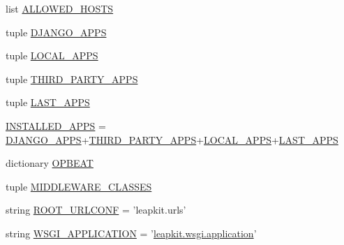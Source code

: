 \begin{DoxyCompactItemize}
\item 
list \hyperlink{namespaceleapkit_1_1settings_1_1base__settings__local_a185e8583ef8f8aeae3517746541daec9}{A\-L\-L\-O\-W\-E\-D\-\_\-\-H\-O\-S\-T\-S}
\item 
tuple \hyperlink{namespaceleapkit_1_1settings_1_1base__settings__local_ac5fa624a9af1a233bfa1639b0fecf935}{D\-J\-A\-N\-G\-O\-\_\-\-A\-P\-P\-S}
\item 
tuple \hyperlink{namespaceleapkit_1_1settings_1_1base__settings__local_a5ff0b2d3a2d30f22997751f82d8fa0a8}{L\-O\-C\-A\-L\-\_\-\-A\-P\-P\-S}
\item 
tuple \hyperlink{namespaceleapkit_1_1settings_1_1base__settings__local_a0d60a9ab4614c31fde45d98813148e97}{T\-H\-I\-R\-D\-\_\-\-P\-A\-R\-T\-Y\-\_\-\-A\-P\-P\-S}
\item 
tuple \hyperlink{namespaceleapkit_1_1settings_1_1base__settings__local_a55f0e121386dcf8a431d6dd210d0ece0}{L\-A\-S\-T\-\_\-\-A\-P\-P\-S}
\item 
\hyperlink{namespaceleapkit_1_1settings_1_1base__settings__local_a02c8604143dd319d558c42a69c1c0a35}{I\-N\-S\-T\-A\-L\-L\-E\-D\-\_\-\-A\-P\-P\-S} = \hyperlink{namespaceleapkit_1_1settings_1_1base__settings__local_ac5fa624a9af1a233bfa1639b0fecf935}{D\-J\-A\-N\-G\-O\-\_\-\-A\-P\-P\-S}+\hyperlink{namespaceleapkit_1_1settings_1_1base__settings__local_a0d60a9ab4614c31fde45d98813148e97}{T\-H\-I\-R\-D\-\_\-\-P\-A\-R\-T\-Y\-\_\-\-A\-P\-P\-S}+\hyperlink{namespaceleapkit_1_1settings_1_1base__settings__local_a5ff0b2d3a2d30f22997751f82d8fa0a8}{L\-O\-C\-A\-L\-\_\-\-A\-P\-P\-S}+\hyperlink{namespaceleapkit_1_1settings_1_1base__settings__local_a55f0e121386dcf8a431d6dd210d0ece0}{L\-A\-S\-T\-\_\-\-A\-P\-P\-S}
\item 
dictionary \hyperlink{namespaceleapkit_1_1settings_1_1base__settings__local_a1167f7a2b6005e88c2b66a1257ce665c}{O\-P\-B\-E\-A\-T}
\item 
tuple \hyperlink{namespaceleapkit_1_1settings_1_1base__settings__local_ad9aeb68875aec786cd3b2ad928fc7a59}{M\-I\-D\-D\-L\-E\-W\-A\-R\-E\-\_\-\-C\-L\-A\-S\-S\-E\-S}
\item 
string \hyperlink{namespaceleapkit_1_1settings_1_1base__settings__local_a8589c90f74e56dc0b81d3eb75fc485d0}{R\-O\-O\-T\-\_\-\-U\-R\-L\-C\-O\-N\-F} = 'leapkit.\-urls'
\item 
string \hyperlink{namespaceleapkit_1_1settings_1_1base__settings__local_aab539798704915674ad7ebc7ac89c58d}{W\-S\-G\-I\-\_\-\-A\-P\-P\-L\-I\-C\-A\-T\-I\-O\-N} = '\hyperlink{namespaceleapkit_1_1wsgi_ae42478854b5ec7a5151d43ea86f16515}{leapkit.\-wsgi.\-application}'

\end{DoxyCompactItemize}
